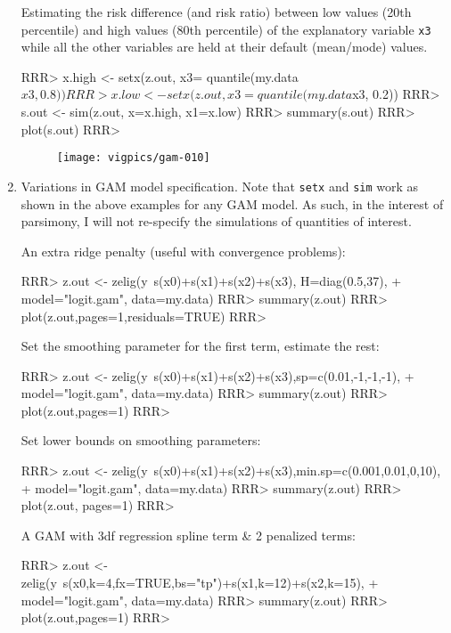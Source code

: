 \begin{enumerate}
Estimating the risk difference (and risk ratio) between low values (20th percentile) and high values (80th percentile) of the explanatory variable {\tt x3} while all the other variables are held at their default (mean/mode) values. 

\begin{Schunk}
\begin{Sinput}
RRR> x.high <- setx(z.out,  x3= quantile(my.data$x3, 0.8))
RRR> x.low <- setx(z.out, x3 = quantile(my.data$x3, 0.2))
RRR> s.out <- sim(z.out, x=x.high, x1=x.low)
RRR> summary(s.out)
RRR> plot(s.out)
RRR> 
\end{Sinput}
\end{Schunk}
\begin{figure}[here]
\centering
\texttt{[image: vigpics/gam-010]}
\label{fig:plotgam}
\end{figure}

\item Variations in GAM model specification. Note that {\tt setx} and {\tt sim} work as shown in the above examples for any GAM model. As such, in the interest of parsimony, I will not re-specify the simulations of quantities of interest. 

An extra ridge penalty (useful with convergence problems):
\begin{Schunk}
\begin{Sinput}
RRR> z.out <- zelig(y~s(x0)+s(x1)+s(x2)+s(x3), H=diag(0.5,37), 
+    model="logit.gam", data=my.data) 
RRR> summary(z.out)
RRR> plot(z.out,pages=1,residuals=TRUE)
RRR> 
\end{Sinput}
\end{Schunk}
Set the smoothing parameter for the first term, estimate the rest:
\begin{Schunk}
\begin{Sinput}
RRR> z.out <- zelig(y~s(x0)+s(x1)+s(x2)+s(x3),sp=c(0.01,-1,-1,-1), 
+    model="logit.gam", data=my.data)
RRR> summary(z.out)
RRR> plot(z.out,pages=1)
RRR> 
\end{Sinput}
\end{Schunk}
Set lower bounds on smoothing parameters:
\begin{Schunk}
\begin{Sinput}
RRR> z.out <- zelig(y~s(x0)+s(x1)+s(x2)+s(x3),min.sp=c(0.001,0.01,0,10),  
+     model="logit.gam", data=my.data) 
RRR> summary(z.out)
RRR> plot(z.out, pages=1)
RRR> 
\end{Sinput}
\end{Schunk}
A GAM with 3df regression spline term \& 2 penalized terms:
\begin{Schunk}
\begin{Sinput}
RRR> z.out <-zelig(y~s(x0,k=4,fx=TRUE,bs="tp")+s(x1,k=12)+s(x2,k=15), 
+     model="logit.gam", data=my.data)
RRR> summary(z.out)
RRR> plot(z.out,pages=1)
RRR> 
\end{Sinput}
\end{Schunk}
\end{enumerate}



